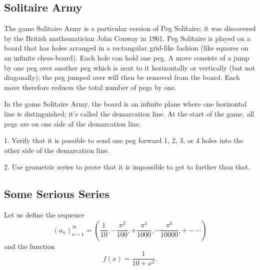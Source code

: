 \documentclass[12pt]{article}
\begin{document}
\subsection{Solitaire Army} 



\vspace*{.2in}


\noindent  The game Solitaire Army is a particular version of Peg Solitaire; it was discovered by the British mathematician John Conway in 1961.   Peg Solitaire is played on a board that has holes arranged in a rectangular grid-like fashion (like squares on an infinite chess-board).  Each hole can hold one peg.  A move consists of a jump by one peg over another peg which is next to it horizontally or vertically (but not diagonally); the peg jumped over will then be removed from the board.  Each move therefore reduces the total number of pegs by one.

In the game Solitaire Army, the board is an infinite plane where one horizontal line is distinguished; it's called the demarcation line.  At the start of the game, all pegs are on one side of the demarcation line.  

1.  Verify that it is possible to send one peg forward 1, 2, 3, or 4 holes into the other side of the demarcation line.  

2.  Use geometric series to prove that it is impossible to get to further than that.  



\subsection{Some Serious Series} 



\vspace*{.2in}

Let us define the sequence $${\displaystyle (a_n)_{n=1}^{\infty} = \left(\frac{1}{10},-\frac{\pi^2}{100},+\frac{\pi^4}{1000},-\frac{\pi^6}{10000},+- \cdots \right)}$$ and the function $${\displaystyle f(x)=\frac{1}{10+x^2}}.$$
\end{document}
